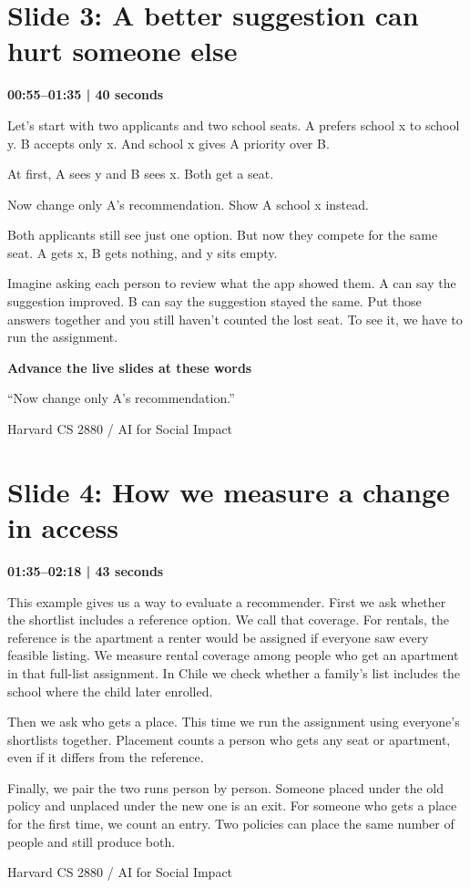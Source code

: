\documentclass[11pt]{article}
\begin{document}
\section*{Slide 3: A better suggestion can hurt someone else}
{\color{navy}\textbf{00:55--01:35 | 40 seconds}}\par\medskip
Let's start with two applicants and two school seats. A prefers school x to school y. B accepts only x. And school x gives A priority over B.
\par
At first, A sees y and B sees x. Both get a seat.
\par
Now change only A's recommendation. Show A school x instead.
\par
Both applicants still see just one option. But now they compete for the same seat. A gets x, B gets nothing, and y sits empty.
\par
Imagine asking each person to review what the app showed them. A can say the suggestion improved. B can say the suggestion stayed the same. Put those answers together and you still haven't counted the lost seat. To see it, we have to run the assignment.
\par
\vfill{\small\textbf{Advance the live slides at these words}\par}
{\small ``Now change only A's recommendation.''}\par
\newpage
{\small Harvard CS 2880 / AI for Social Impact}\par
\section*{Slide 4: How we measure a change in access}
{\color{navy}\textbf{01:35--02:18 | 43 seconds}}\par\medskip
This example gives us a way to evaluate a recommender. First we ask whether the shortlist includes a reference option. We call that coverage. For rentals, the reference is the apartment a renter would be assigned if everyone saw every feasible listing. We measure rental coverage among people who get an apartment in that full-list assignment. In Chile we check whether a family's list includes the school where the child later enrolled.
\par
Then we ask who gets a place. This time we run the assignment using everyone's shortlists together. Placement counts a person who gets any seat or apartment, even if it differs from the reference.
\par
Finally, we pair the two runs person by person. Someone placed under the old policy and unplaced under the new one is an exit. For someone who gets a place for the first time, we count an entry. Two policies can place the same number of people and still produce both.
\par
\newpage
{\small Harvard CS 2880 / AI for Social Impact}\par
\end{document}
